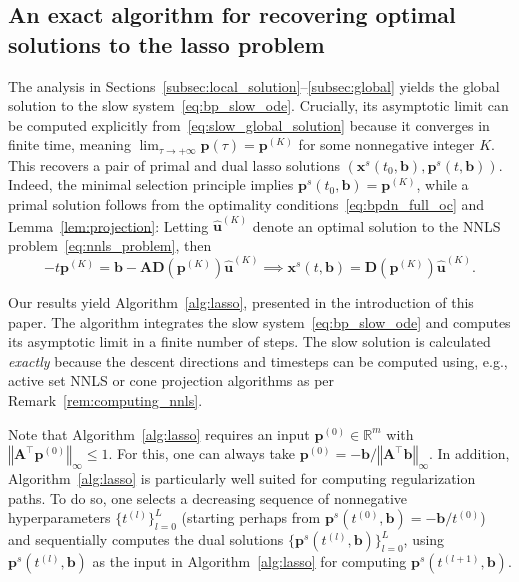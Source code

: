 \documentclass[11pt]{article}
\numberwithin{prop}{section}
\numberwithin{lem}{section}
\numberwithin{rem}{section}
\numberwithin{cor}{section}
\numberwithin{thm}{section}
\numberwithin{defn}{section}
\numberwithin{fact}{section}
\theoremstyle{plain}
\def\bb {\boldsymbol{b}}
\def\tzero {t_{0}}
\def\bp {\boldsymbol{p}}
\def\bu {\boldsymbol{u}}
\def\bx {\boldsymbol{x}}
\def\R {\mathbb{R}}
\newcommand{\norminf}[1]{\left\Vert{#1} \right\Vert_{\infty}}
\newcommand{\matr}[1]{\bm{#1}}
\def\Rm {\R^m}
\def\Atop {\matr{A}^{\top}}
\begin{document}
\subsection{An exact algorithm for recovering optimal solutions to the lasso problem}\label{subsection:recovery_sols}
The analysis in Sections~\ref{subsec:local_solution}--\ref{subsec:global} yields the global solution to the slow system~\eqref{eq:bp_slow_ode}. Crucially, its asymptotic limit can be computed explicitly from~\eqref{eq:slow_global_solution} because it converges in finite time, meaning $\lim_{\tau \to +\infty}\bp(\tau) = \bp^{(K)}$ for some nonnegative integer $K$. This recovers a pair of primal and dual lasso solutions $(\bx^{s}(\tzero,\bb),\bp^{s}(t,\bb))$. Indeed, the minimal selection principle implies $\bp^{s}(\tzero,\bb) = \bp^{(K)}$, while a primal solution follows from the optimality conditions~\eqref{eq:bpdn_full_oc} and Lemma~\ref{lem:projection}: Letting $\hat{\bu}^{(K)}$ denote an optimal solution to the NNLS problem~\eqref{eq:nnls_problem}, then
\[
-t\bp^{(K)} = \bb - \matr{A}\matr{D}(\bp^{(K)})\hat{\bu}^{(K)} \implies \bx^{s}(t,\bb) = \matr{D}(\bp^{(K)})\hat{\bu}^{(K)}.
\]


Our results yield Algorithm~\ref{alg:lasso}, presented in the introduction of this paper. The algorithm integrates the slow system~\eqref{eq:bp_slow_ode} and computes its asymptotic limit in a finite number of steps. The slow solution is calculated \emph{exactly} because the descent directions and timesteps can be computed using, e.g., active set NNLS or cone projection algorithms as per Remark~\ref{rem:computing_nnls}.


Note that Algorithm~\ref{alg:lasso} requires an input $\bp^{(0)} \in \Rm$ with $\norminf{\Atop\bp^{(0)}} \leqslant 1$. For this, one can always take $\bp^{(0)} = -\bb/\norminf{\Atop\bb}$. In addition, Algorithm~\ref{alg:lasso} is particularly well suited for computing regularization paths. To do so, one selects a decreasing sequence of nonnegative hyperparameters $\{t^{(l)}\}_{l=0}^{L}$ (starting perhaps from $\bp^{s}(t^{(0)},\bb) = -\bb/t^{(0)}$) and sequentially computes the dual solutions $\{\bp^{s}(t^{(l)},\bb)\}_{l=0}^{L}$, using $\bp^{s}(t^{(l)},\bb)$ as the input in Algorithm~\ref{alg:lasso} for computing $\bp^{s}(t^{(l+1)},\bb)$.
\end{document}
